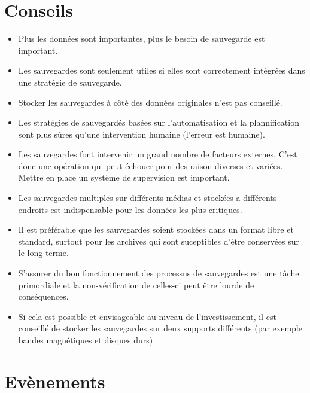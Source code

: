 \documentclass[a4paper,11pt]{report}
\begin{document}
\section{Conseils}

\begin{itemize}
\item Plus les données sont importantes, plus le besoin de sauvegarde est important.
\item Les sauvegardes sont seulement utiles si elles sont correctement intégrées dans une stratégie de sauvegarde.
\item Stocker les sauvegardes à côté des données originales n'est pas conseillé.
\item Les stratégies de sauvegardés basées sur l'automatisation et la plannification sont plus sûres qu'une intervention humaine (l'erreur est humaine).
\item Les sauvegardes font intervenir un grand nombre de facteurs externes. C'est donc une opération qui peut échouer pour des raison diverses et variées. Mettre en place un système de supervision est important.
\item Les sauvegardes multiples sur différents médias et stockées a différents endroits est indispensable pour les données les plus critiques.
\item Il est préférable que les sauvegardes soient stockées dans un format libre et standard, surtout pour les archives qui sont suceptibles d'être conservées sur le long terme.
\item S'assurer du bon fonctionnement des processus de sauvegardes est une tâche primordiale et la non-vérification de celles-ci peut être lourde de conséquences.
\item Si cela est possible et envisageable au niveau de l'investissement, il est conseillé de stocker les sauvegardes sur deux supports différents (par exemple bandes magnétiques et disques durs)
\end{itemize}

\section{Evènements}
\end{document}
